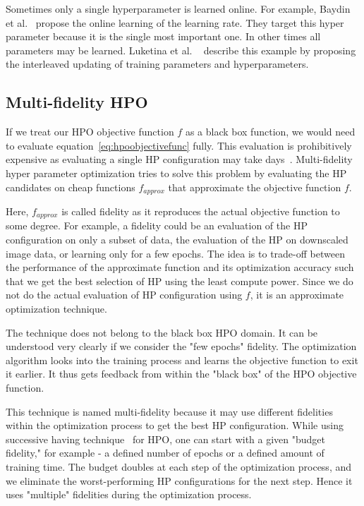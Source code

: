 \documentclass[12pt, twoside, ngerman]{report}
\begin{document}
Sometimes only a single hyperparameter is learned online.
For example,  Baydin et al.~\cite{onlineLearningRateUpdate} propose the online learning of the learning rate. They target this hyper parameter because it is the single most important one.
In other times all parameters may be learned. Luketina et al. ~\cite{gradientbasedHPOtuning} describe this example by proposing the interleaved updating of training parameters and hyperparameters.


\subsection{Multi-fidelity HPO}
If we treat our HPO objective function $f$ as a black box function,  we would need to evaluate equation~\ref{eq:hpoobjectivefunc} fully.
This evaluation is prohibitively expensive as evaluating a single HP configuration may take days~\cite{hutter2019automated}.
Multi-fidelity hyper parameter optimization tries to solve this problem by evaluating the HP candidates on cheap functions $f_{approx}$ that approximate the objective function $f$.

Here, $f_{approx}$  is called fidelity as it reproduces the actual objective function to some degree.
For example, a fidelity could be an evaluation of the HP configuration on only a subset of data, the evaluation of the HP on downscaled image data, or learning only for a few epochs.
The idea is to trade-off between the performance of the approximate function and its optimization accuracy such that we get the best selection of HP using the least compute power.
Since we do not do the actual evaluation of HP configuration using $f$, it is an approximate optimization technique.

The technique does not belong to the black box HPO domain.
It can be understood very clearly if we consider the "few epochs" fidelity.
The optimization algorithm looks into the training process and learns the objective function to exit it earlier.
It thus gets feedback from within the "black box" of the HPO objective function.

This technique is named multi-fidelity because it may use different fidelities within the optimization process to get the best HP configuration.
While using successive having technique~\cite{successivehalving} for HPO, one can start with a given "budget fidelity," for example - a defined number of epochs or a defined amount of training time.
The budget doubles at each step of the optimization process, and we eliminate the worst-performing HP configurations for the next step.
Hence it uses "multiple" fidelities during the optimization process.
\end{document}
